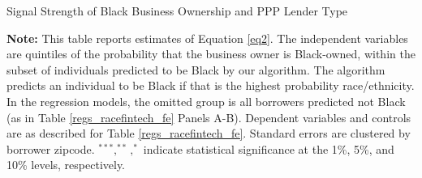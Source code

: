 \documentclass[11pt]{article}
\begin{document}
\newpage
\begin{table}[H]
	\caption{Signal Strength of Black Business Ownership and PPP Lender Type} \label{regs_race_signal}
	\begin{adjustbox}{width=\linewidth}
		
	\end{adjustbox}
	
	\begin{adjustbox}{width=.92\linewidth}
		
	\end{adjustbox} 
         \begin{minipage}{\linewidth} \medskip
            \footnotesize{{\bf Note: }This table reports estimates of Equation \ref{eq2}. The independent variables are quintiles of the probability that the business owner is Black-owned, within the subset of individuals predicted to be Black by our algorithm. The algorithm predicts an individual to be Black if that is the highest probability race/ethnicity. In the regression models, the omitted group is all borrowers predicted not Black (as in Table \ref{regs_racefintech_fe} Panels A-B). Dependent variables and controls are as described for Table  \ref{regs_racefintech_fe}. Standard errors are clustered by borrower zipcode. $^{***}, ^{**}, ^{*}$ indicate statistical significance at the 1\%, 5\%, and 10\% levels, respectively.}
        \end{minipage}
    \end{table} 
\end{document}
